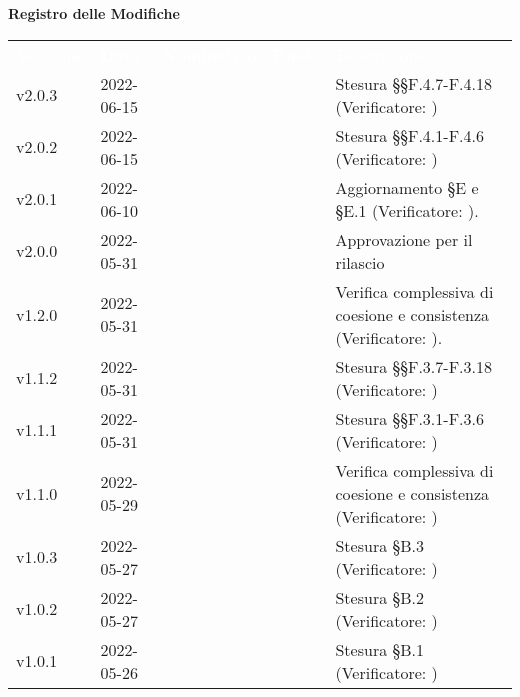 
{\LARGE{\textbf{Registro delle Modifiche}}} \\

\renewcommand{\arraystretch}{1.5}
\begin{longtable}{ m{}<{\centering}  m{}<{\centering}  m{}<{\centering}  m{}<{\centering}  m{}<{\centering} }
	\rowcolor{darkblue}
	\textcolor{white}{\textbf{Versione}} &\textcolor{white}{\textbf{Data}}& \textcolor{white}{\textbf{Nominativo}} & \textcolor{white}{\textbf{Ruolo}}&\textcolor{white}{\textbf{Descrizione}}\\

	v2.0.3 & 2022-06-15 & \LW & \VE & Stesura §§F.4.7-F.4.18 (Verificatore: \textit{\MG})\\
	
	v2.0.2 & 2022-06-15 & \FP & \VE & Stesura §§F.4.1-F.4.6 (Verificatore: \textit{\MG})\\

	v2.0.1 & 2022-06-10 & \GC & \VE & Aggiornamento \S{E} e \S{E.1}  (Verificatore: \textit{\EP}).\\

	v2.0.0 & 2022-05-31 & \PV & \RE & Approvazione per il rilascio \\

	v1.2.0 & 2022-05-31 & \FP & \VE & Verifica complessiva di coesione e consistenza (Verificatore: \textit{\EP}).\\

	v1.1.2 & 2022-05-31 & \LW & \VE & Stesura §§F.3.7-F.3.18 (Verificatore: \textit{\EP})\\

	v1.1.1 & 2022-05-31 & \FP & \VE & Stesura §§F.3.1-F.3.6 (Verificatore: \textit{\EP})\\

	v1.1.0 & 2022-05-29 & \MG & \VE & Verifica complessiva di coesione e consistenza (Verificatore: \textit{\EP})\\
	
	v1.0.3 & 2022-05-27 & \MG & \AN & Stesura \S{B.3} (Verificatore: \textit{\EP})\\	

	v1.0.2 & 2022-05-27 & \GC & \AN & Stesura \S{B.2} (Verificatore: \textit{\EP})\\	

	v1.0.1 & 2022-05-26 & \FP & \AN & Stesura \S{B.1} (Verificatore: \textit{\EP})\\	
	

\end{longtable}

